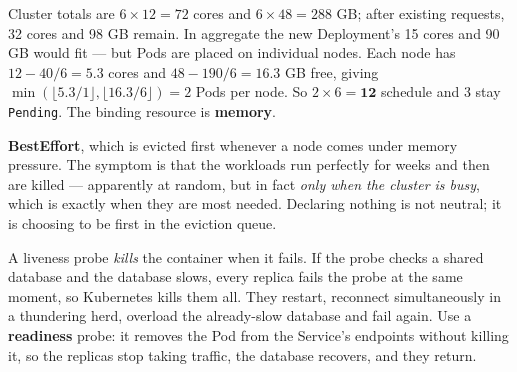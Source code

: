 \begin{ans}
  \item Cluster totals are $6 \times 12 = 72$ cores and $6 \times 48 = 288$ GB;
        after existing requests, 32 cores and 98 GB remain. In aggregate the new
        Deployment's 15 cores and 90 GB would fit --- but Pods are placed on
        individual nodes. Each node has $12 - 40/6 = 5.3$ cores and
        $48 - 190/6 = 16.3$ GB free, giving
        $\min(\lfloor 5.3/1 \rfloor, \lfloor 16.3/6 \rfloor) = 2$ Pods per node.
        So $2 \times 6 = \mathbf{12}$ schedule and 3 stay \texttt{Pending}. The
        binding resource is \textbf{memory}.
  \item \textbf{BestEffort}, which is evicted first whenever a node comes under
        memory pressure. The symptom is that the workloads run perfectly for
        weeks and then are killed --- apparently at random, but in fact
        \emph{only when the cluster is busy}, which is exactly when they are
        most needed. Declaring nothing is not neutral; it is choosing to be
        first in the eviction queue.
  \item A liveness probe \emph{kills} the container when it fails. If the probe
        checks a shared database and the database slows, every replica fails the
        probe at the same moment, so Kubernetes kills them all. They restart,
        reconnect simultaneously in a thundering herd, overload the already-slow
        database and fail again. Use a \textbf{readiness} probe: it removes the
        Pod from the Service's endpoints without killing it, so the replicas
        stop taking traffic, the database recovers, and they return.
\end{ans}

